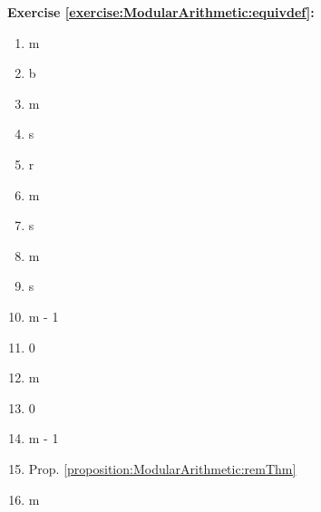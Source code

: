 \noindent\textbf{Exercise \ref{exercise:ModularArithmetic:equivdef}:} %
\begin{multicols}{4}
\begin{enumerate}
\item
m

\item
b

\item
m

\item
s

\item
r

\item
m

\item
s

\item
m

\item
s

\item
m - 1

\item
0

\item
m

\item
0

\item
m - 1

\item
Prop. \ref{proposition:ModularArithmetic:remThm} 

\item
m
\end{enumerate}
\end{multicols}

